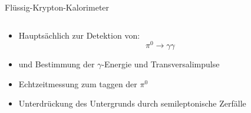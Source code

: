 \documentclass[aspectratio=1610, professionalfonts, 9pt, t]{beamer}
\begin{document}
\begin{frame}{Flüssig-Krypton-Kalorimeter}
\begin{columns}[onlytextwidth]
\begin{column}{0.5\textwidth}
\begin{itemize}
          \item Hauptsächlich zur Detektion von:
          \begin{equation*}
            \pi^0 \rightarrow \gamma \gamma
          \end{equation*}
          \item[] und Bestimmung der $\gamma$-Energie und Transversalimpulse
          \item Echtzeitmessung zum taggen der $\pi^0$
          \item Unterdrückung des Untergrunds durch semileptonische Zerfälle %
        \end{itemize}
      \end{column}
    \end{columns}
  \end{frame}
\end{document}
